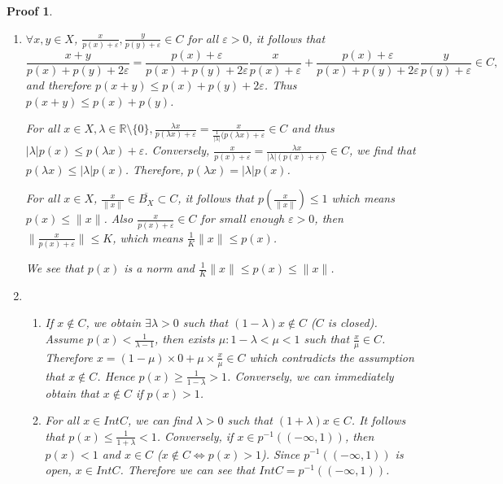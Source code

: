 \documentclass[hyperref,UTF8]{ctexart}
\newtheorem{pf}{Proof}[section]
\begin{document}
\begin{pf}
\begin{enumerate}
    \item $\forall x, y\in X$, $\frac{x}{p(x) + \varepsilon}, \frac{y}{p(y) + \varepsilon}\in C$ for all $\varepsilon > 0$, it follows that 
    \[\frac{x + y}{p(x) + p(y) + 2\varepsilon} = \frac{p(x) + \varepsilon}{p(x) + p(y) + 2\varepsilon}\frac{x}{p(x) + \varepsilon} + \frac{p(x) + \varepsilon}{p(x) + p(y) + 2\varepsilon}\frac{y}{p(y) + \varepsilon}\in C, \]
    and therefore $p(x+y) \leq p(x) + p(y) + 2\varepsilon$. Thus $p(x + y) \leq p(x) + p(y)$. 

    For all $ x \in X, \lambda\in \mathbb R\setminus \{0\}, \frac{\lambda x}{p(\lambda x) + \varepsilon} = \frac{x}{\frac{1}{|\lambda|}(p(\lambda x) + \varepsilon}\in C$ and thus $|\lambda|p(x)\leq p(\lambda x) + \varepsilon$. Conversely, $\frac{x}{p(x) + \varepsilon} = \frac{\lambda x}{|\lambda|(p(x) + \varepsilon)}\in C$, we find that $p(\lambda x)\leq |\lambda|p(x)$. Therefore, $p(\lambda x) = |\lambda|p(x)$. 

    For all $x\in X$, $\frac{x}{\|x\|}\in \overline{B_X}\subset C$, it follows that $p(\frac{x}{\|x\|})\leq 1$ which means $p(x)\leq \|x\|$. Also $\frac{x}{p(x) + \varepsilon}\in C$ for small enough $\varepsilon > 0$, then $\|\frac{x}{p(x) + \varepsilon}\|\leq K$, which means $\frac1K\|x\|\leq p(x)$. 

    We see that $p(x)$ is a norm and $\frac1K\|x\|\leq p(x)\leq \|x\|$. 
    \item \begin{enumerate}
        \item If $x\notin C$, we obtain $\exists \lambda > 0$ such that $(1-\lambda) x\notin C$ ($C$ is closed). Assume $p(x)<\frac1{\lambda-1}$, then exists $\mu : 1-\lambda < \mu <1$ such that $\frac x \mu\in C$. Therefore $x = (1-\mu)\times0 + \mu\times\frac{x}{\mu}\in C$ which contradicts the assumption that $x\notin C$. Hence $p(x) \geq \frac1{1-\lambda}>1$. Conversely, we can immediately obtain that $x\notin C$ if $p(x) > 1$. 
        
        \item For all $x\in Int C$, we can find $\lambda > 0$ such that $(1+\lambda)x\in C$. It follows that $p(x) \leq \frac1{1+\lambda} < 1$. Conversely, if $x\in p^{-1}((-\infty, 1))$, then $p(x) < 1$ and $x\in C$ ($x\notin C\iff p(x) > 1$). Since $p^{-1}((-\infty, 1))$ is open, $x\in Int C$. Therefore we can see that $Int C = p^{-1}((-\infty, 1))$. 
        

\end{enumerate}
\end{enumerate}
\end{pf}
\end{document}
